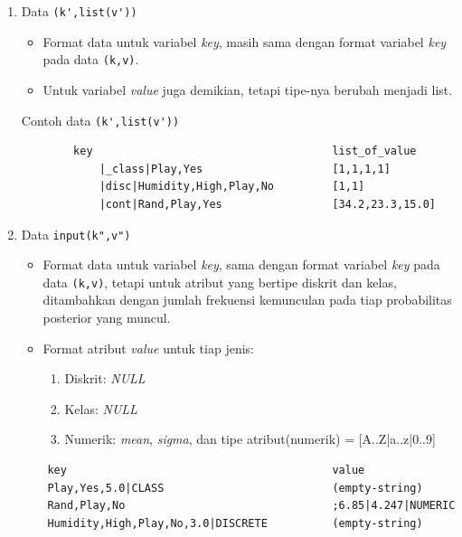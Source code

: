\begin{enumerate}
	\item{Data \verb|(k',list(v'))|}
	\begin{itemize}
		\item Format data untuk variabel \textit{key}, masih sama dengan format variabel \textit{key} pada data \verb|(k,v)|.
		\item Untuk variabel \textit{value} juga demikian, tetapi tipe-nya berubah menjadi list.
	\end{itemize}
	Contoh data \verb|(k',list(v'))|
	\begin{lstlisting}
		key										list_of_value		
			|_class|Play,Yes					[1,1,1,1]
			|disc|Humidity,High,Play,No			[1,1]
			|cont|Rand,Play,Yes					[34.2,23.3,15.0]
	\end{lstlisting}
	\item{Data \verb|input(k",v")|}
	\begin{itemize}
		\item Format data untuk variabel \textit{key}, sama dengan format variabel \textit{key} pada data \verb|(k,v)|, tetapi untuk atribut yang bertipe diskrit dan kelas, ditambahkan dengan jumlah frekuensi kemunculan pada tiap probabilitas posterior yang muncul.
		\item Format atribut \textit{value} untuk tiap jenis:
		\begin{enumerate}
			\item{Diskrit}: \textit{NULL}
			\item{Kelas}: \textit{NULL}
			\item{Numerik}: \textit{mean}, \textit{sigma}, dan tipe atribut(numerik) = [A..Z|a..z|0..9]
		\end{enumerate}
	\end{itemize}

	\begin{lstlisting}
	key											value
	Play,Yes,5.0|CLASS							(empty-string)
	Rand,Play,No								;6.85|4.247|NUMERIC
	Humidity,High,Play,No,3.0|DISCRETE			(empty-string)
	\end{lstlisting}
	
\end{enumerate}


